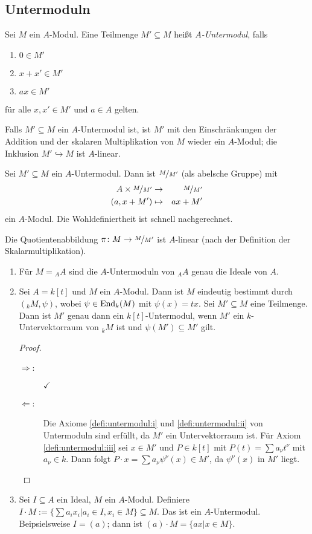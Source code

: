 \documentclass[12pt,a4paper]{scrartcl}
\theoremstyle{cplain}
\theoremstyle{cdef}
\begin{document}
\subsection{Untermoduln}
\begin{defi}
	Sei $M$ ein $A$-Modul. Eine Teilmenge $M'\subseteq M$ heißt \emph{$A$-Untermodul}, falls
	\begin{enumerate}
		\item $0\in M'$ \label{defi:untermodul:i}
		\item $x+x'\in M'$ \label{defi:untermodul:ii}
		\item $ax\in M'$ \label{defi:untermodul:iii}
    \end{enumerate}
    für alle $x,x' \in M'$ und $a \in A$ gelten.

	Falls $M'\subseteq M$ ein $A$-Untermodul ist, ist $M'$ mit den Einschränkungen der Addition und der skalaren Multiplikation von $M$ wieder ein $A$-Modul; die Inklusion $M'\hookrightarrow M$ ist $A$-linear.
	
	Sei $M'\subseteq M$ ein $A$-Untermodul. Dann ist $\nicefrac{M}{M'}$ (als abelsche Gruppe) mit 
	\begin{eqnarray*}
		A\times \nicefrac{M}{M'} & \to & \nicefrac{M}{M'}\\
		(a, x+M') &\mapsto& ax + M'
	\end{eqnarray*}
	ein $A$-Modul. Die Wohldefiniertheit ist schnell nachgerechnet.
	
	Die Quotientenabbildung $\pi\colon M\to \nicefrac{M}{M'}$ ist $A$-linear (nach der Definition der Skalarmultiplikation).
\end{defi}
\begin{bsp}
	\leavevmode
	\begin{enumerate}
		\item Für $M = {}_AA$ sind die $A$-Untermoduln von ${}_AA$ genau die Ideale von $A$.
		\item Sei $A = k[t]$ und $M$ ein $A$-Modul. Dann ist $M$ eindeutig bestimmt durch $({}_kM, \psi)$, wobei $\psi\in\operatorname{End}_k(M)$ mit $\psi(x) = tx$. Sei $M'\subseteq M$ eine Teilmenge. Dann ist $M'$ genau dann ein $k[t]$-Untermodul, wenn $M'$ ein $k$-Untervektorraum von ${}_kM$ ist und $\psi(M')\subseteq M'$ gilt.
		\begin{proof}
		\leavevmode
		\begin{description}
			\item[\glqq $\Rightarrow$\grqq:] $\checkmark$
			\item[\glqq $\Leftarrow$\grqq:]
            Die Axiome \ref{defi:untermodul:i} und \ref{defi:untermodul:ii} von Untermoduln sind erfüllt, da $M'$ ein Untervektorraum ist. Für Axiom \ref{defi:untermodul:iii} sei $x\in M'$ und $P\in k[t]$ mit $P(t) = \sum a_\nu t^\nu$ mit $a_\nu\in k$. Dann folgt $P\cdot x = \sum a_\nu\psi^\nu(x)\in M'$, da $\psi^\nu(x)$ in $M'$ liegt.
            \qedhere
		\end{description}
		\end{proof}
		\item Sei $I\subseteq A$ ein Ideal, $M$ ein $A$-Modul. Definiere $I\cdot M  := \{\sum a_ix_i|a_i\in I, x_i\in M\}\subseteq M$. Das ist ein $A$-Untermodul. Beipsielsweise $I = (a)$; dann ist $(a)\cdot M = \{ax|x\in M\}$.
	\end{enumerate}
\end{bsp}
\end{document}
